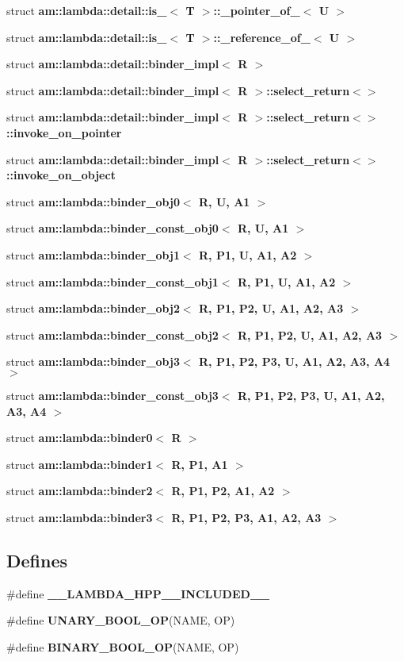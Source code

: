 \begin{CompactItemize}
\item 
struct \textbf{am::lambda::detail::is\_\-$<$ T $>$::\_\-pointer\_\-of\_\-$<$ U $>$}
\item 
struct \textbf{am::lambda::detail::is\_\-$<$ T $>$::\_\-reference\_\-of\_\-$<$ U $>$}
\item 
struct \textbf{am::lambda::detail::binder\_\-impl$<$ R $>$}
\item 
struct \textbf{am::lambda::detail::binder\_\-impl$<$ R $>$::select\_\-return$<$$>$}
\item 
struct \textbf{am::lambda::detail::binder\_\-impl$<$ R $>$::select\_\-return$<$$>$::invoke\_\-on\_\-pointer}
\item 
struct \textbf{am::lambda::detail::binder\_\-impl$<$ R $>$::select\_\-return$<$$>$::invoke\_\-on\_\-object}
\item 
struct {\bf am::lambda::binder\_\-obj0$<$ R, U, A1 $>$}
\item 
struct {\bf am::lambda::binder\_\-const\_\-obj0$<$ R, U, A1 $>$}
\item 
struct {\bf am::lambda::binder\_\-obj1$<$ R, P1, U, A1, A2 $>$}
\item 
struct {\bf am::lambda::binder\_\-const\_\-obj1$<$ R, P1, U, A1, A2 $>$}
\item 
struct {\bf am::lambda::binder\_\-obj2$<$ R, P1, P2, U, A1, A2, A3 $>$}
\item 
struct {\bf am::lambda::binder\_\-const\_\-obj2$<$ R, P1, P2, U, A1, A2, A3 $>$}
\item 
struct {\bf am::lambda::binder\_\-obj3$<$ R, P1, P2, P3, U, A1, A2, A3, A4 $>$}
\item 
struct {\bf am::lambda::binder\_\-const\_\-obj3$<$ R, P1, P2, P3, U, A1, A2, A3, A4 $>$}
\item 
struct {\bf am::lambda::binder0$<$ R $>$}
\item 
struct {\bf am::lambda::binder1$<$ R, P1, A1 $>$}
\item 
struct {\bf am::lambda::binder2$<$ R, P1, P2, A1, A2 $>$}
\item 
struct {\bf am::lambda::binder3$<$ R, P1, P2, P3, A1, A2, A3 $>$}
\end{CompactItemize}
\subsection*{Defines}
\begin{CompactItemize}
\item 
\#define \textbf{\_\-\_\-LAMBDA\_\-HPP\_\-\_\-INCLUDED\_\-\_\-}\label{lambda_8hpp_d07b71d47578d363a02f00922be41cb1}

\item 
\#define {\bf UNARY\_\-BOOL\_\-OP}(NAME, OP)
\item 
\#define {\bf BINARY\_\-BOOL\_\-OP}(NAME, OP)
\end{CompactItemize}
